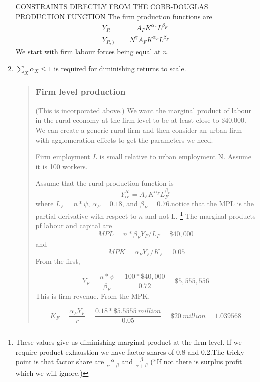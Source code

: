 \begin{enumerate}
CONSTRAINTS DIRECTLY FROM THE COBB-DOUGLAS PRODUCTION FUNCTION
The firm production functions are 
\begin{align}
Y_R  &= \quad  A_FK^{\alpha_F}L^{\beta_F}\\
Y_{R, )} &= N^\gamma A_FK^{\alpha_F}L^{\beta_F}
\end{align}
We start with firm labour forces  being equal at $n$.

\item $\sum_X \alpha_X \le 1$ is required for diminishing returns to scale. 




\begin{quotation} \color{orange}
\subsubsection{Firm level production}   
(This is incorporated above.) We want the marginal product of labour in the rural economy at the firm level to be at least close to \$40,000.  We can create a generic rural firm and then consider an urban firm with agglomeration effects to get the parameters we need. 

Firm employment $L$ is small relative to  urban employment {N}. Assume it is 100 workers. 

Assume that the rural production function is 
\[ Y_{iF}^R=A_{F} K^{\alpha_F} L_F^{\beta_F} \]
where  $L_F=n*\psi$, $\alpha_F=0.18 $,  and $\beta_F=0.76$.notice that the MPL is the partial derivative with respect to $n$ and not L. 
\footnote{These values give us diminishing marginal product at the firm level. If we require product exhaustion we have factor shares of  0.8 and 0.2.The tricky point is that factor share are 
 $\frac{\alpha}{\alpha + \beta}$ and $\frac{\beta}{\alpha + \beta}$
(*If not there is surplus profit  which we will ignore.)}   
The marginal products pf labour and capital are 
\[MPL=n*\beta_F Y_F/L_F=\$40,000\] and\[\ MPK=\alpha_F Y_F/K_F =0.05\]
From the first, 

\[Y_F=\frac{n*\psi}{\beta_F}=\frac{100*\$40,000}{0.72}=\$5,555,556\]
This is firm revenue. From the MPK, 

\[K_F=  \frac{\alpha_F Y_F }{r}=\frac{0.18 *\$5.5555\ million}{0.05} =\$20\ million = 1.039568 \]


\end{quotation}
\end{enumerate}

